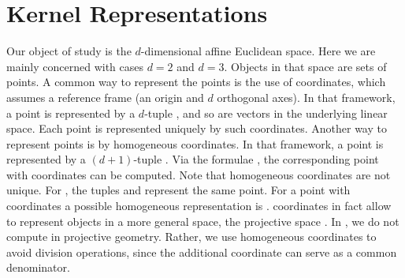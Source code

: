 \chapter{Kernel Representations}
Our object of study is the $d$-dimensional affine Euclidean space. 
Here we are mainly concerned with cases $d=2$ and $d=3$.
Objects in that space are sets of points. A common way to represent 
the points is the use of  coordinates,
which assumes a reference frame (an origin and $d$ orthogonal axes).
In that framework, a point is represented by a $d$-tuple
,
and so are vectors in the underlying linear space. Each point is 
represented uniquely by such  coordinates.
Another way to represent points is by homogeneous coordinates. In that
framework, a point is represented by a $(d+1)$-tuple
.
Via the formulae
,
the corresponding point with  coordinates
can be computed.  Note that homogeneous coordinates are not unique. 
For ,
the tuples 
 and 
 represent the
same point.
For a point with  coordinates  a
possible homogeneous representation is
.
 coordinates in fact allow to represent 
objects in a more general space, the projective space
.
In \cgal, we do not compute in projective geometry. Rather, we use 
homogeneous coordinates to avoid division operations,
since the additional coordinate can serve as a common denominator.

